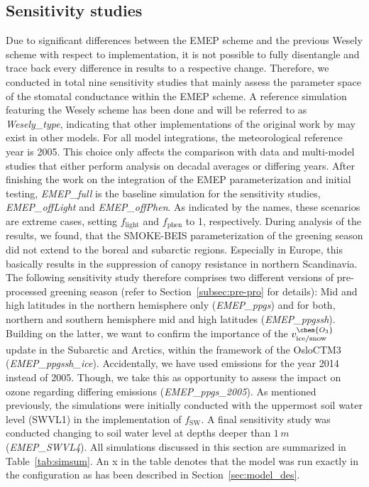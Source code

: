 \documentclass[gmd, manuscript]{copernicus}
\begin{document}
\subsection{Sensitivity studies}
\label{subsec:sens}
Due to significant differences between the EMEP scheme and the previous Wesely scheme with respect to implementation, it is not possible to fully disentangle and trace back every difference in results to a respective change. Therefore, we conducted in total nine sensitivity studies that mainly assess the parameter space of the stomatal conductance within the EMEP scheme. A reference simulation featuring the Wesely scheme has been done and will be referred to as \emph{Wesely\_type}, indicating that other implementations of the original work by \citet{AE:Wesely1989} may exist in other models. For all model integrations, the meteorological reference year is 2005. This choice only affects the comparison with data and multi-model studies that either perform analysis on decadal averages or differing years. After finishing the work on the integration of the EMEP parameterization and initial testing, \emph{EMEP\_full} is the baseline simulation for the sensitivity studies, \emph{EMEP\_offLight} and \emph{EMEP\_offPhen}. As indicated by the names, these scenarios are extreme cases, setting $f_\text{light}$ and $f_\text{phen}$ to 1, respectively. During analysis of the results, we found, that the SMOKE-BEIS parameterization of the greening season did not extend to the boreal and subarctic regions. Especially in Europe, this basically results in the suppression of canopy resistance in northern Scandinavia. The following sensitivity study therefore comprises two different versions of pre-processed greening season (refer to Section~\ref{subsec:pre-pro} for details): Mid and high latitudes in the northern hemisphere only (\emph{EMEP\_ppgs}) and for both, northern and southern hemisphere mid and high latitudes (\emph{EMEP\_ppgssh}). Building on the latter, we want to confirm the importance of the $v^\chem{O_3}_\text{ice/snow}$ update \citep{ACP:Helmig2007} in the Subarctic and Arctics, within the framework of the OsloCTM3 (\emph{EMEP\_ppgssh\_ice}). Accidentally, we have used emissions for the year 2014 instead of 2005. Though, we take this as opportunity to assess the impact on ozone regarding differing emissions (\emph{EMEP\_ppgs\_2005}). As mentioned previously, the simulations were initially conducted with the uppermost soil water level (SWVL1) in the implementation of $f_\text{SW}$. A final sensitivity study was conducted changing to soil water level at depths deeper than $1\,\unit{m}$ (\emph{EMEP\_SWVL4}).
All simulations discussed in this section are summarized in Table~\ref{tab:simsum}. An x in the table denotes that the model was run exactly in the configuration as has been described in Section~\ref{sec:model_des}.
\end{document}
